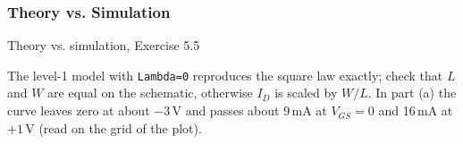 \subsubsection*{Theory vs. Simulation}
\begin{comparison}{Theory vs. simulation, Exercise 5.5}
\end{comparison}
\begin{solution}
The level-1 model with \texttt{Lambda=0} reproduces the square law exactly; check that $L$ and $W$ are equal on the
schematic, otherwise $I_D$ is scaled by $W/L$. In part (a) the curve leaves zero at about $-3$\,V and passes about 9\,mA at
$V_{GS}=0$ and 16\,mA at $+1$\,V (read on the grid of the plot).
\end{solution}
